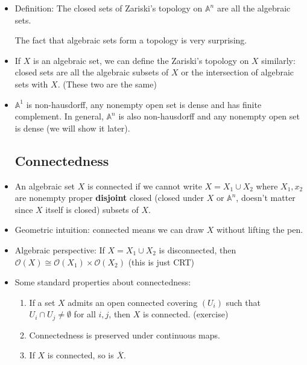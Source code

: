 \documentclass[15pt]{scrartcl}
\newcommand{\A}{\mathbb{A}}
\begin{document}
\begin{itemize}
    \subsection{Basic Definitions}
    \item Definition: The closed sets of Zariski's topology on $\A^n$ are all the algebraic sets. 
    \begin{remark}
        The fact that algebraic sets form a topology is very surprising. 
    \end{remark}
    \item If $X$ is an algebraic set, we can define the Zariski's topology on $X$ similarly: closed sets are all the algebraic subsets of $X$ or the intersection of algebraic sets with $X$. (These two are the same)
    \item $\A^1$ is non-hausdorff, any nonempty open set is dense and has finite complement. In general, $\A^n$ is also non-hausdorff and any nonempty open set is dense (we will show it later).
    \subsection{Connectedness}
    \item An algebraic set $X$ is connected if we cannot write $X=X_1\cup X_2$ where $X_1, x_2$ are nonempty proper \textbf{disjoint} closed (closed under $X$ or $\A^n$, doesn't matter since $X$ itself is closed) subsets of $X$.
    \item Geometric intuition: connected means we can draw $X$ without lifting the pen.
    \item Algebraic perspective: If $X=X_1\cup X_2$ is disconnected, then $\mathcal{O}(X)\cong \mathcal{O}(X_1)\times \mathcal{O}(X_2)$ (this is just CRT)
    \item Some standard properties about connectedness: 
    \begin{enumerate}
        \item If a set $X$ admits an open connected covering $(U_i)$ such that $U_i\cap U_j\neq \emptyset$ for all $i,j$, then $X$ is connected. (exercise)
        \item Connectedness is preserved under continuous maps. 
        \item If $X$ is connected, so is $\overline{X}$. 
    \end{enumerate}

\end{itemize}
\end{document}
